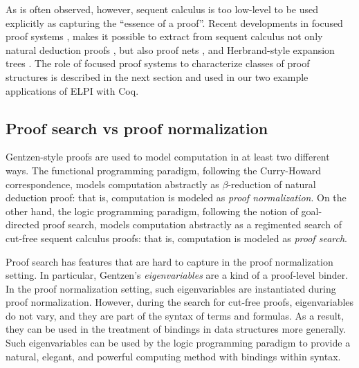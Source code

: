 As is often observed, however, sequent calculus is too low-level to be
used explicitly as capturing the ``essence of a proof''.  Recent
developments in focused proof systems \cite{andreoli92jlc,liang09tcs},
makes it possible to extract from sequent calculus not only natural
deduction proofs \cite{pimentel16lsfa}, but also proof nets
\cite{chaudhuri08tcs}, and Herbrand-style expansion trees
\cite{chaudhuri16jlc}.  The role of focused proof systems to
characterize classes of proof structures is described in the next
section and used in our two example applications of ELPI with Coq.



\subsection{Proof search vs proof normalization}

Gentzen-style proofs are used to model computation in at least two
different ways.  The functional programming paradigm, following the
Curry-Howard correspondence, models computation abstractly as 
$\beta$-reduction of natural deduction proof: that is, computation is
modeled as \emph{proof normalization}.  On the other hand, the
logic programming paradigm, following the notion of goal-directed
proof search, models computation abstractly as a regimented search of
cut-free sequent calculus proofs: that is, computation is modeled
as \emph{proof search}.

Proof search has features that are hard to capture in the proof
normalization setting.  In particular, Gentzen's \emph{eigenvariables}
are a kind of a proof-level binder.  In the proof normalization
setting, such eigenvariables are instantiated during proof
normalization.  However, during the search for cut-free proofs,
eigenvariables do not vary, and they are part of the syntax of terms
and formulas.  As a result, they can be used in the treatment of
bindings in data structures more generally.  Such eigenvariables can
be used by the logic programming paradigm to provide a natural,
elegant, and powerful computing method with bindings within syntax.

